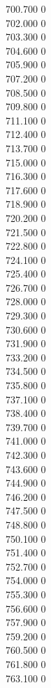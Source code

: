 { 700.700	0 \\
 702.000	0 \\
 703.300	0 \\
 704.600	0 \\
 705.900	0 \\
 707.200	0 \\
 708.500	0 \\
 709.800	0 \\
 711.100	0 \\
 712.400	0 \\
 713.700	0 \\
 715.000	0 \\
 716.300	0 \\
 717.600	0 \\
 718.900	0 \\
 720.200	0 \\
 721.500	0 \\
 722.800	0 \\
 724.100	0 \\
 725.400	0 \\
 726.700	0 \\
 728.000	0 \\
 729.300	0 \\
 730.600	0 \\
 731.900	0 \\
 733.200	0 \\
 734.500	0 \\
 735.800	0 \\
 737.100	0 \\
 738.400	0 \\
 739.700	0 \\
 741.000	0 \\
 742.300	0 \\
 743.600	0 \\
 744.900	0 \\
 746.200	0 \\
 747.500	0 \\
 748.800	0 \\
 750.100	0 \\
 751.400	0 \\
 752.700	0 \\
 754.000	0 \\
 755.300	0 \\
 756.600	0 \\
 757.900	0 \\
 759.200	0 \\
 760.500	0 \\
 761.800	0 \\
 763.100	0 \\
}
